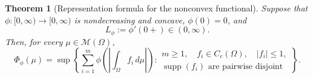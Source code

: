 \documentclass[11pt]{amsart}
\newtheorem{theorem}{Theorem}[section]
\theoremstyle{definition}
\theoremstyle{remark}
\DeclareMathOperator{\supp}{supp}
\begin{document}
\begin{theorem}[Representation formula for the nonconvex functional]
\label{thm:phi-lsc}
Suppose that $\phi:[0,\infty)\to[0,\infty)$ is nondecreasing and concave,
$\phi(0)=0$, and
\begin{equation*}
	L_\phi:=\phi'(0+)\in(0,\infty).
\end{equation*}
Then, for every $\mu\in\mathcal M(\Omega)$,
\begin{equation}
\label{eq:phi-disjoint-representation}
	\Phi_\phi(\mu)
	=\sup\left\{
	\sum_{i=1}^m\phi\left(\left|\int_\Omega f_i\,d\mu\right|\right):
	\begin{array}{l}
		m\ge1,\quad f_i\in C_c(\Omega),\quad |f_i|\le1,\\
		\supp(f_i)\text{ are pairwise disjoint}
	\end{array}
	\right\}.
\end{equation}
\end{theorem}
\end{document}
